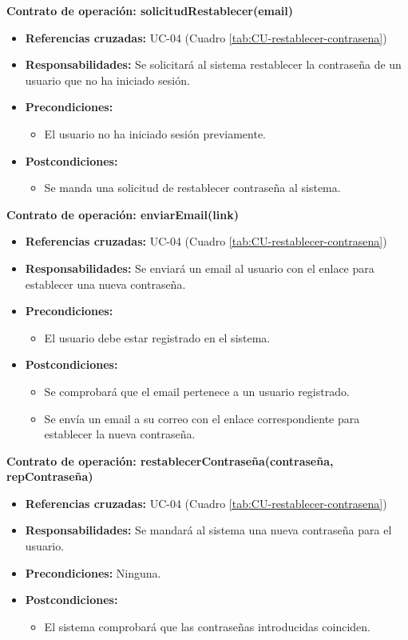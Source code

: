 \textbf{Contrato de operación: solicitudRestablecer(email)}
\begin{itemize}
\item \textbf{Referencias cruzadas:} UC-04 (Cuadro \ref{tab:CU-restablecer-contrasena})
\item \textbf{Responsabilidades:} Se solicitará al sistema restablecer la contraseña de un usuario que no ha iniciado sesión.
\item \textbf{Precondiciones:} 
 \begin{itemize}
\item El usuario no ha iniciado sesión previamente.
\end {itemize}
\item \textbf{Postcondiciones:} 
 \begin{itemize}
\item Se manda una solicitud de restablecer contraseña al sistema.
\end {itemize}
\end {itemize}

\textbf{Contrato de operación: enviarEmail(link)}
\begin{itemize}
\item \textbf{Referencias cruzadas:} UC-04 (Cuadro \ref{tab:CU-restablecer-contrasena})
\item \textbf{Responsabilidades:} Se enviará un email al usuario con el enlace para establecer una nueva contraseña.
\item \textbf{Precondiciones:} 
 \begin{itemize}
\item El usuario debe estar registrado en el sistema.
\end {itemize}
\item \textbf{Postcondiciones:} 
 \begin{itemize}
\item Se comprobará que el email pertenece a un usuario registrado.
\item Se envía un email a su correo con el enlace correspondiente para establecer la nueva contraseña.
\end {itemize}
\end {itemize}

\textbf{Contrato de operación: restablecerContraseña(contraseña, repContraseña)}
\begin{itemize}
\item \textbf{Referencias cruzadas:} UC-04 (Cuadro \ref{tab:CU-restablecer-contrasena})
\item \textbf{Responsabilidades:} Se mandará al sistema una nueva contraseña para el usuario.
\item \textbf{Precondiciones:} Ninguna.
\item \textbf{Postcondiciones:} 
 \begin{itemize}
\item El sistema comprobará que las contraseñas introducidas coinciden.
\end {itemize}
\end {itemize}

